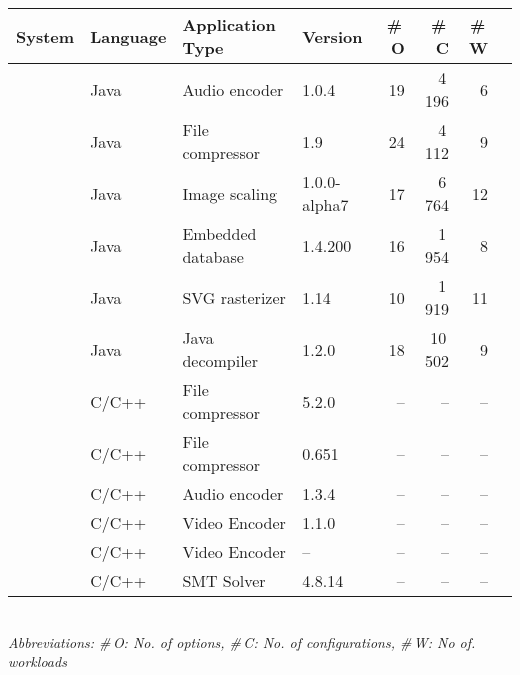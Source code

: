 \begin{tabular}{p{0.8cm}lp{2.0cm}lrrrr}
		\toprule
		\textbf{System} & \textbf{Language} & \textbf{Application Type} & \textbf{Version} & \textbf{ \#\,O} & \textbf{\#\,C} & \textbf{\#\,W}  \\
		\midrule
		\jumper & Java & Audio encoder & 1.0.4 & 19 & 4\,196 & 6   \\
		
		\kanzi &Java  & File compressor & 1.9 & 24 & 4\,112 & 9 \\
			
		\dconvert & Java & Image scaling & 1.0.0-alpha7 & 17 & 6\,764 & 12  \\
				
		\htwo & Java & Embedded database & 1.4.200 & 16 & 1\,954  & 8  \\
		
		\batik & Java & SVG rasterizer & 1.14 & 10 & 1\,919 &  11  \\
		
		\jadx & Java & Java decompiler & 1.2.0 & 18 & 10\,502 & 9  \\
		
		\midrule
		
		\rowcolor{cyan!20} \xz & C/C++ & File compressor & 5.2.0 & -- & -- & --  \\
		\rowcolor{cyan!20}\lrzip & C/C++ & File compressor & 0.651 & -- & -- & --  \\
		\rowcolor{cyan!20}\flac & C/C++ & Audio encoder & 1.3.4 & -- & -- & --  \\
		\rowcolor{cyan!20}\vpnine & C/C++ & Video Encoder & 1.1.0 & -- & -- & --  \\
		\rowcolor{cyan!20}\xzwo & C/C++ & Video Encoder & -- & -- & -- & --  \\
		\rowcolor{cyan!20}\zdrei & C/C++ & SMT Solver & 4.8.14 & -- & -- & --  \\
\bottomrule

\end{tabular}\\
{\vspace{1mm}\textit{Abbreviations: \#\,O: No. of options, \#\,C: No. of configurations, \#\,W: No of. workloads}}
